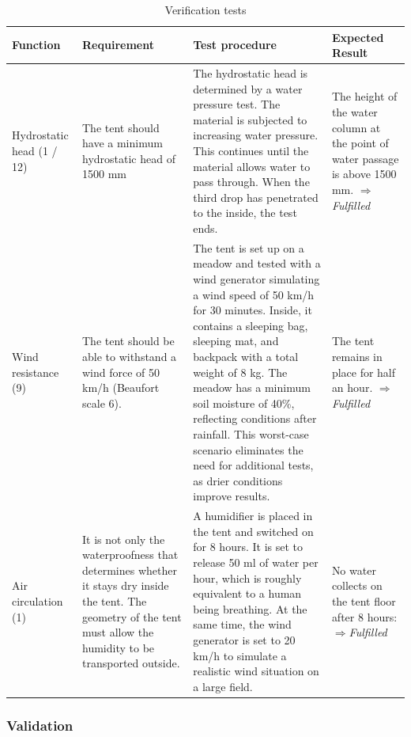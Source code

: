 \documentclass{article}
\begin{document}
\renewcommand{\arraystretch}{1.5}

\begin{table}[ht!]
    \caption{Verification tests}
    \label{tab:verification}
    \begin{tabularx}{\textwidth}{|p{2.5cm}|p{3.5cm}|p{6cm}|X|}
    \hline
    \textbf{Function} & \textbf{Requirement} & \textbf{Test procedure} & \textbf{Expected Result} \\
    \hline
    Hydrostatic head (1 / 12) & 
    The tent should have a minimum hydrostatic head of 1500 mm & 
    The hydrostatic head is determined by a water pressure test. The material is subjected to increasing water pressure. This continues until the material allows water to pass through. When the third drop has penetrated to the inside, the test ends. &
    The height of the water column at the point of water passage is above 1500 mm. \textcolor{newgreen}{$\Rightarrow$\textit{Fulfilled}} \\
    \hline
    Wind resistance (9) &
    The tent should be able to withstand a wind force of 50 km/h (Beaufort scale 6). &
    The tent is set up on a meadow and tested with a wind generator simulating a wind speed of 50 km/h for 30 minutes. Inside, it contains a sleeping bag, sleeping mat, and backpack with a total weight of 8 kg. The meadow has a minimum soil moisture of 40\%, reflecting conditions after rainfall. This worst-case scenario eliminates the need for additional tests, as drier conditions improve results. &
    The tent remains in place for half an hour. \textcolor{newgreen}{$\Rightarrow$\textit{Fulfilled}} \\
    \hline
    Air circulation (1) &
    It is not only the waterproofness that determines whether it stays dry inside the tent. The geometry of the tent must allow the humidity to be transported outside. &
    A humidifier is placed in the tent and switched on for 8 hours. It is set to release 50 ml of water per hour, which is roughly equivalent to a human being breathing. At the same time, the wind generator is set to 20 km/h to simulate a realistic wind situation on a large field. &
    No water collects on the tent floor after 8 hours: \textcolor{newgreen}{$\Rightarrow$\textit{Fulfilled}} \\
    \hline
    \end{tabularx}
\end{table}

\subsubsection{Validation}
\end{document}
